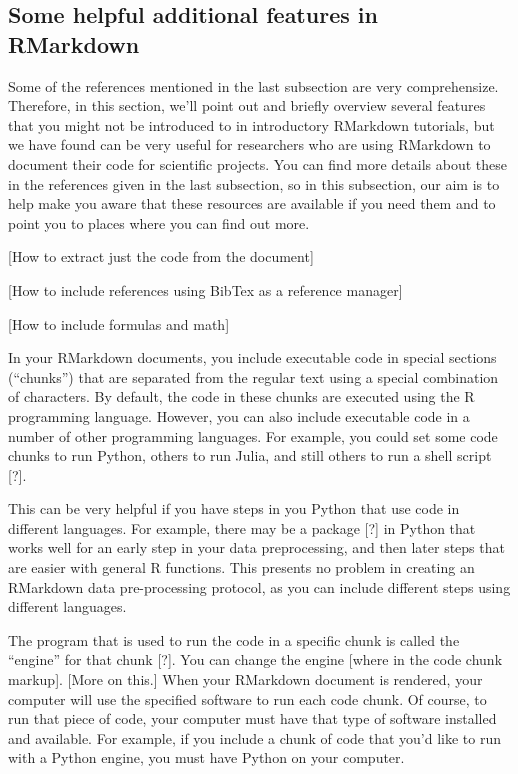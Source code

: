 \documentclass[]{tufte-book}
\begin{document}
\hypertarget{some-helpful-additional-features-in-rmarkdown-1}{%
\subsection{Some helpful additional features in RMarkdown}\label{some-helpful-additional-features-in-rmarkdown-1}}

Some of the references mentioned in the last subsection are very comprehensize.
Therefore, in this section, we'll point out and briefly overview several
features that you might not be introduced to in introductory RMarkdown
tutorials, but we have found can be very useful for researchers who are using
RMarkdown to document their code for scientific projects. You can find more
details about these in the references given in the last subsection, so in this
subsection, our aim is to help make you aware that these resources are available
if you need them and to point you to places where you can find out more.

{[}How to extract just the code from the document{]}

{[}How to include references using BibTex as a reference manager{]}

{[}How to include formulas and math{]}

In your RMarkdown documents, you include executable code in special sections
(``chunks'') that are separated from the regular text using a special combination
of characters. By default, the code in these chunks are executed using the
R programming language. However, you can also include executable code in a
number of other programming languages. For example, you could set some code
chunks to run Python, others to run Julia, and still others to run a
shell script {[}?{]}.

This can be very helpful if you have steps in you Python that use code in
different languages. For example, there may be a package {[}?{]} in Python that
works well for an early step in your data preprocessing, and then later
steps that are easier with general R functions. This presents no problem in
creating an RMarkdown data pre-processing protocol, as you can include
different steps using different languages.

The program that is used to run the code in a specific chunk is called the
``engine'' for that chunk {[}?{]}. You can change the engine {[}where in the code
chunk markup{]}. {[}More on this.{]} When your RMarkdown document is rendered,
your computer will use the specified software to run each code chunk. Of course,
to run that piece of code, your computer must have that type of software installed
and available. For example, if you include a chunk of code that you'd like to
run with a Python engine, you must have Python on your computer.
\end{document}
